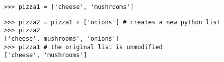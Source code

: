 \vspace{6mm}

\begin{lstlisting}
>>> pizza1 = ['cheese', 'mushrooms']
\end{lstlisting}


\vspace{2mm}

\begin{lstlisting}
>>> pizza2 = pizza1 + ['onions'] # creates a new python list
>>> pizza2
['cheese', mushrooms', 'onions']
>>> pizza1 # the original list is unmodified
['cheese', 'mushrooms']
\end{lstlisting}

